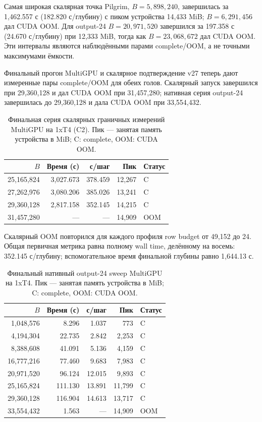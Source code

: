 \documentclass[10pt,twocolumn]{article}
\begin{document}
Самая широкая скалярная точка Pilgrim, $B=5{,}898{,}240$, завершилась за
1,462.557 с (182.820 с/глубину) с пиком устройства 14,433 MiB;
$B=6{,}291{,}456$ дал CUDA OOM. Для output-24 $B=20{,}971{,}520$ завершился за
197.358 с
(24.670 с/глубину) при 12,333 MiB, тогда как $B=23{,}068{,}672$ дал CUDA OOM.
Эти интервалы являются наблюдёнными парами complete/OOM, а не точными
максимумами ёмкости.

Финальный прогон MultiGPU и скалярное подтверждение v27 теперь дают
измеренные пары complete/OOM для обеих голов. Скалярный запуск завершился при
29,360,128 и дал CUDA OOM при 31,457,280; нативная серия output-24 завершилась
до 29,360,128 и дала CUDA OOM при 33,554,432.

\begin{table}[t]
\centering
\small
\setlength{\tabcolsep}{2pt}
\caption{Финальная серия скалярных граничных измерений MultiGPU на 1xT4 (C2).
Пик --- занятая память устройства в MiB; C: complete, OOM: CUDA OOM.}
\label{tab:multigpu_v11_partial}
\begin{tabular}{@{}rrrrl@{}}
\toprule
$B$ & Время (с) & с/шаг & Пик & Статус \\
\midrule
25,165,824 & 3,027.673 & 378.459 & 12,267 & C \\
27,262,976 & 3,080.206 & 385.026 & 13,241 & C \\
29,360,128 & 2,817.158 & 352.145 & 14,215 & C \\
31,457,280 & --- & --- & 14,909 & OOM \\
\bottomrule
\end{tabular}
\end{table}

Скалярный OOM повторился для каждого профиля row budget от 49,152 до 24.
Общая первичная метрика равна полному wall time, делённому на восемь:
352.145 с/глубину; вспомогательное время финальной глубины равно 1,644.13 с.

\begin{table}[t]
\centering
\small
\setlength{\tabcolsep}{2pt}
\caption{Финальный нативный output-24 sweep MultiGPU на 1xT4.
Пик --- занятая память устройства в MiB; C: complete, OOM: CUDA OOM.}
\label{tab:multigpu_output24}
\begin{tabular}{@{}rrrrl@{}}
\toprule
$B$ & Время (с) & с/шаг & Пик & Статус \\
\midrule
1,048,576 & 8.296 & 1.037 & 773 & C \\
4,194,304 & 22.735 & 2.842 & 2,253 & C \\
8,388,608 & 41.091 & 5.136 & 4,159 & C \\
16,777,216 & 77.460 & 9.683 & 7,983 & C \\
20,971,520 & 96.124 & 12.015 & 9,893 & C \\
25,165,824 & 111.130 & 13.891 & 11,799 & C \\
29,360,128 & 116.904 & 14.613 & 13,717 & C \\
33,554,432 & 1.563 & --- & 14,909 & OOM \\
\bottomrule
\end{tabular}
\end{table}
\end{document}
